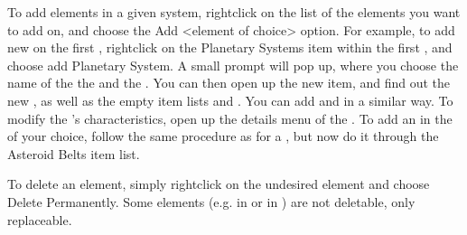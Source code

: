 \documentclass[letterpaper,10pt,english]{sphinxmanual}
\begin{document}
\sphinxAtStartPar
To add elements in a given system, right\sphinxhyphen{}click on the list of the elements you want
to add on, and choose the Add \textless{}element of choice\textgreater{} option. For example, to add new
{\hyperref[\detokenize{celestial_systems/planetary_system:id1}]{}} on the first {\hyperref[\detokenize{celestial_systems/stellar_system:id1}]{}},
right\sphinxhyphen{}click on the Planetary Systems item within the first {\hyperref[\detokenize{celestial_systems/stellar_system:id1}]{}},
and choose add Planetary System. A small prompt
will pop up, where you choose the name of the the {\hyperref[\detokenize{celestial_systems/planetary_system:id1}]{}}
and the {\hyperref[\detokenize{celestial_bodies/planet:id1}]{}}.
You can then open up the new {\hyperref[\detokenize{celestial_systems/planetary_system:id1}]{}} item,
and find out the new {\hyperref[\detokenize{celestial_bodies/planet:id1}]{}}, as
well as the empty item lists {\hyperref[\detokenize{celestial_bodies/satellite:id1}]{}} and {\hyperref[\detokenize{celestial_bodies/trojan:id1}]{}}.
You can add {\hyperref[\detokenize{celestial_bodies/satellite:id1}]{}} and {\hyperref[\detokenize{celestial_bodies/trojan:id1}]{}} in
a similar way. To modify the {\hyperref[\detokenize{celestial_bodies/planet:id1}]{}}’s characteristics, open up the details menu of the
{\hyperref[\detokenize{celestial_bodies/planet:id1}]{}}. To add an {\hyperref[\detokenize{celestial_bodies/asteroid_belt:id1}]{}} in the
{\hyperref[\detokenize{celestial_systems/stellar_system:id1}]{}} of your choice, follow the same
procedure as for a {\hyperref[\detokenize{celestial_systems/planetary_system:id1}]{}},
but now do it through the Asteroid Belts item list.

\sphinxAtStartPar
To delete an element, simply right\sphinxhyphen{}click on the undesired element and choose
Delete Permanently.
Some elements (e.g. {\hyperref[\detokenize{celestial_bodies/planet:id1}]{}} in {\hyperref[\detokenize{celestial_systems/planetary_system:id1}]{}}
or {\hyperref[\detokenize{celestial_bodies/star:id1}]{}} in {\hyperref[\detokenize{celestial_systems/stellar_system:id1}]{}}) are not deletable, only replaceable.
\end{document}
